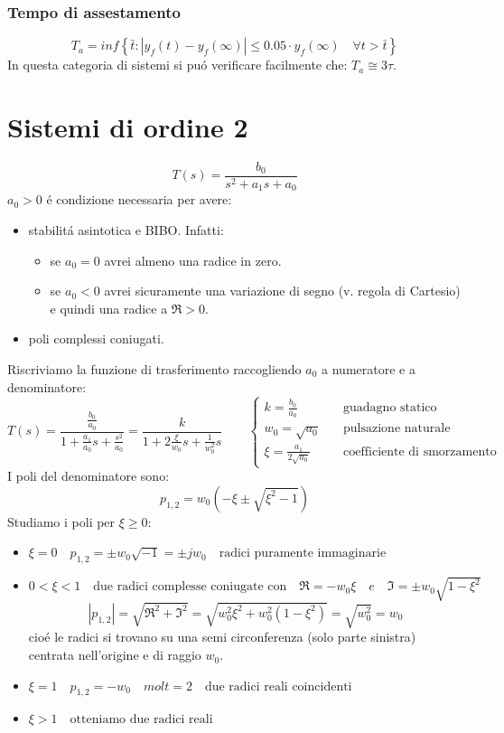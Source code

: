 \documentclass[../main.tex]{subfiles}
\begin{document}
	\subsubsection{Tempo di assestamento}
		\[
			T_a = inf \left\lbrace \bar t : | y_f(t) - y_f(\infty) | \leq 0.05 \cdot y_f(\infty) \quad \forall t > \bar t \right\rbrace
		\]
		In questa categoria di sistemi si pu\'o verificare facilmente che: $ T_a \cong 3\tau $.
		
	\section{Sistemi di ordine 2}
		\[ 
			T(s) = \frac{b_0}{s^2+a_1s+a_0}
		\]
		$ a_0 > 0 $ \'e condizione necessaria per avere:
		\begin{itemize}
			\item 
				stabilit\'a asintotica e BIBO. Infatti:
				\begin{itemize}
					\item 
						se $ a_0 = 0 $ avrei almeno una radice in zero.
					\item 
						se $ a_0 < 0 $ avrei sicuramente una variazione di segno (v. regola di Cartesio) e quindi una radice a $ \Re>0 $.
				\end{itemize}
			\item 
				poli complessi coniugati.
		\end{itemize}
		Riscriviamo la funzione di trasferimento raccogliendo $ a_0 $ a numeratore e a denominatore:
		\[ 
			T(s) = \frac{\frac{b_0}{a_0}}{1+\frac{a_1}{a_0}s+\frac{s^2}{a_0}} = \frac{k}{1+2\frac{\xi}{w_0}s+\frac{1}{w_0^2}s}
			\qquad
			\begin{cases}
				k = \frac{b_0}{a_0} \quad &\text{guadagno statico}
				\\
				w_0 = \sqrt{a_0} \quad &\text{pulsazione naturale}
				\\
				\xi = \frac{a_1}{2\sqrt{a_0}} \quad &\text{coefficiente di smorzamento}
			\end{cases}
		\]
		I poli del denominatore sono:
		\[ 
			p_{1,2} = w_0(-\xi \pm \sqrt{\xi^2-1})
		\]
		Studiamo i poli per $ \xi \geq 0 $:
		\begin{itemize}
			\item 
				$ \xi = 0 \quad p_{1,2} =\pm w_0 \sqrt{-1} = \pm jw_0 \quad \text{radici puramente immaginarie}$
			\item 
				$ 0 < \xi < 1 \quad \text{due radici complesse coniugate con} \quad \Re = -w_0\xi \quad e \quad \Im = \pm w_0 \sqrt{1-\xi^2} $
				\[ 
					\left| p_{1,2} \right| = \sqrt{\Re^2 + \Im^2} = \sqrt{w_0^2\xi^2 + w_0^2(1-\xi^2)} = \sqrt{w_0^2} = w_0
				\]
				cio\'e le radici si trovano su una semi circonferenza (solo parte sinistra) centrata nell'origine e di raggio $ w_0 $.
			\item 
				$ \xi = 1 \quad p_{1,2} = -w_0 \quad molt=2 \quad \text{due radici reali coincidenti} $
			\item 
				$ \xi > 1 \quad \text{otteniamo due radici reali} $
		\end{itemize}
\end{document}
